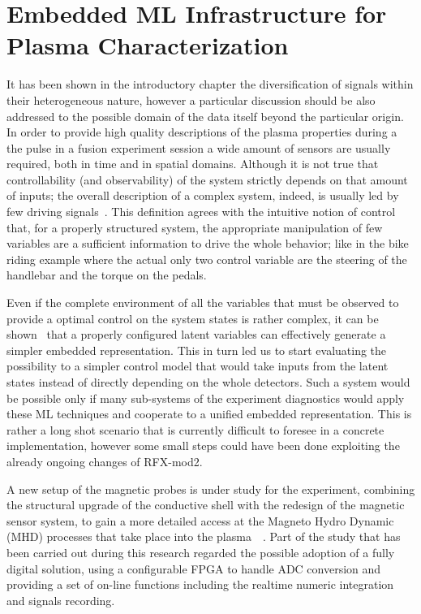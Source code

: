 
\chapter{Embedded ML Infrastructure for Plasma Characterization}
\label{section:4_embedded_ML}

It has been shown in the introductory chapter the diversification of signals within their heterogeneous nature, however a particular discussion should be also addressed to the possible domain of the data itself beyond the particular origin.
In order to provide high quality descriptions of the plasma properties during a the pulse in a fusion experiment session a wide amount of sensors are usually required, both in time and in spatial domains.
Although it is not true that controllability (and observability) of the system strictly depends on that amount of inputs; the overall description of a complex system, indeed, is usually led by few driving signals~\cite{Liu2011}. 
This definition agrees with the intuitive notion of control that, for a properly structured system, the appropriate manipulation of few variables are a sufficient information to drive the whole behavior; like in the bike riding example where the actual only two control variable are the steering of the handlebar and the torque on the pedals. 

Even if the complete environment of all the variables that must be observed to provide a optimal control on the system states is rather complex, it can be shown\cite{Lesort_2018}~\cite{an2019unsupervised} that a properly configured latent variables can effectively generate a simpler embedded representation. This in turn led us to start evaluating the possibility to a simpler control model that would take inputs from the latent states instead of directly depending on the whole detectors.
Such a system would be possible only if many sub-systems of the experiment diagnostics would apply these ML techniques and cooperate to a unified embedded representation. This is rather a long shot scenario that is currently difficult to foresee in a concrete implementation, however some small steps could have been done exploiting the already ongoing changes of RFX-mod2.

A new setup of the magnetic probes is under study for the experiment, combining the structural upgrade of the conductive shell with the redesign of the magnetic sensor system, to gain a more detailed access at the Magneto Hydro Dynamic (MHD) processes that take place into the plasma~\cite{zuin2009current}~\cite{innocente2014tearing}.
Part of the study that has been carried out during this research regarded the possible adoption of a fully digital solution, using a configurable FPGA to handle ADC conversion and providing a set of on-line functions including the realtime numeric integration and signals recording.

